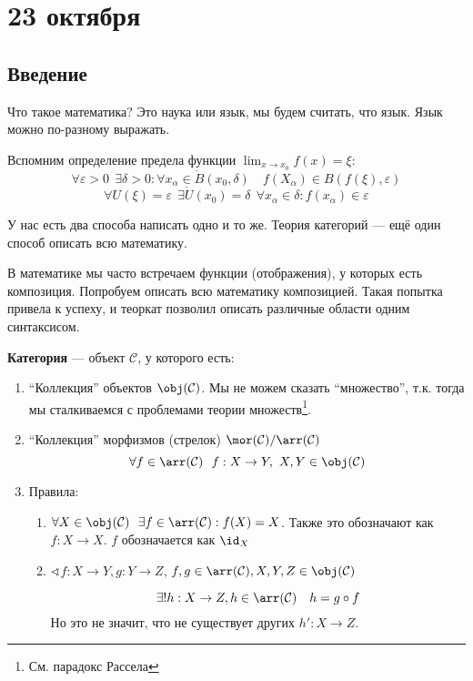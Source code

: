 \chapter{23 октября}

\section{Введение}

Что такое математика? Это наука или язык, мы будем считать, что язык. Язык можно по-разному выражать.

\begin{example}
    Вспомним определение предела функции \(\lim_{x \to x_0} f(x) = \xi\):
    \[\forall \varepsilon > 0 \ \ \exists \delta > 0 : \forall x_\alpha \in \dot{B}(x_0, \delta) \quad f(X_\alpha) \in B(f(\xi), \varepsilon)\]
    \[\forall U(\xi) = \varepsilon \ \ \exists \dot{U}(x_0) = \delta \ \ \forall x_\alpha \in \delta : f(x_\alpha) \in \varepsilon\]

    У нас есть два способа написать одно и то же. Теория категорий --- ещё один способ описать всю математику.
\end{example}

В математике мы часто встречаем функции (отображения), у которых есть композиция. Попробуем описать всю математику композицией. Такая попытка привела к успеху, и теоркат позволил описать различные области одним синтаксисом.

\begin{definition}
    \textbf{Категория} --- объект \(\mathcal{C}\), у которого есть:
    \begin{enumerate}
        \item ``Коллекция'' объектов \(\obj(\mathcal{C})\). Мы не можем сказать ``множество'', т.к. тогда мы сталкиваемся с проблемами теории множеств\footnote{См. парадокс Рассела}.
        \item ``Коллекция'' морфизмов (стрелок) \(\mor(\mathcal{C}) / \arr(\mathcal{C})\)
              \[\forall f \in \arr(\mathcal{C}) \ \ f : X \to Y, \ X, Y \in \obj(\mathcal{C})\]
        \item Правила: \begin{enumerate}
                  \item \(\forall X \in \obj(\mathcal{C}) \ \ \exists f \in \arr(\mathcal{C}) : f(X) = X\). Также это обозначают как \(f : X \to X\). \(f\) обозначается как \(\id_X\)
                  \item \(\sphericalangle f : X \to Y, g : Y \to Z\), \(f, g \in \arr(\mathcal{C}), X,Y,Z \in \obj(\mathcal{C})\)

                        \[\exists! h : X \to Z, h \in \arr(\mathcal{C}) \quad h = g \circ f\]
                        Но это не значит, что не существует других \(h' : X \to Z\).
              \end{enumerate}
    \end{enumerate}
\end{definition}

